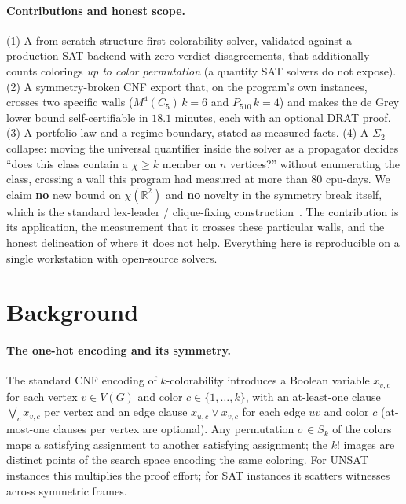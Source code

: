 \documentclass[11pt]{article}
\theoremstyle{definition}
\newcommand{\R}{\mathbb{R}}
\newcommand{\chrom}{\chi}
\begin{document}
\paragraph{Contributions and honest scope.} (1) A from-scratch structure-first
colorability solver, validated against a production SAT backend with zero verdict
disagreements, that additionally counts colorings \emph{up to color permutation}
(a quantity SAT solvers do not expose). (2) A symmetry-broken CNF export that, on
the program's own instances, crosses two specific walls
($M^4(C_5)\,k{=}6$ and $P_{510}\,k{=}4$) and makes the de Grey lower bound
self-certifiable in $18.1$ minutes, each with an optional DRAT proof. (3) A
portfolio law and a regime boundary, stated as measured facts. (4) A
$\Sigma_2$ collapse: moving the universal quantifier inside the solver as a
propagator decides ``does this class contain a $\chrom \ge k$ member on $n$
vertices?'' without enumerating the class, crossing a wall this program had
measured at more than $80$ cpu-days. We claim
\textbf{no} new bound on $\chrom(\R^2)$ and \textbf{no} novelty in the symmetry
break itself, which is the standard lex-leader / clique-fixing
construction~\cite{CrawfordSymmetry1996, SakallahSymmetry2009}. The contribution
is its application, the measurement that it crosses these particular walls, and
the honest delineation of where it does not help. Everything here is reproducible
on a single workstation with open-source solvers.

\section{Background}
\label{sec:background}

\paragraph{The one-hot encoding and its symmetry.} The standard CNF encoding of
$k$-colorability introduces a Boolean variable $x_{v,c}$ for each vertex
$v \in V(G)$ and color $c \in \{1,\dots,k\}$, with an at-least-one clause
$\bigvee_c x_{v,c}$ per vertex and an edge clause
$\overline{x_{u,c}} \vee \overline{x_{v,c}}$ for each edge $uv$ and color $c$
(at-most-one clauses per vertex are optional). Any permutation $\sigma \in S_k$ of
the colors maps a satisfying assignment to another satisfying assignment; the
$k!$ images are distinct points of the search space encoding the same coloring.
For UNSAT instances this multiplies the proof effort; for SAT instances it
scatters witnesses across symmetric frames.
\end{document}
